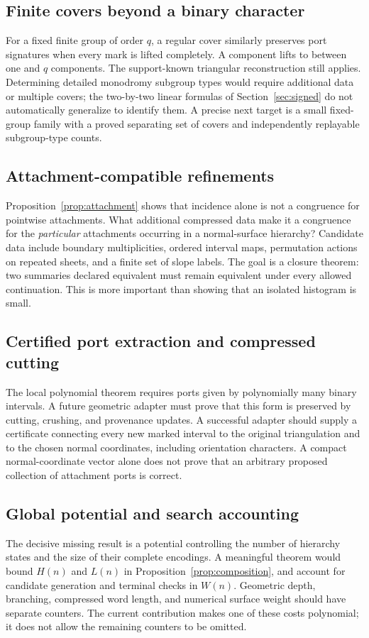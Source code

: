 \documentclass[11pt,letterpaper]{article}
\begin{document}
\subsection{Finite covers beyond a binary character}
For a fixed finite group of order $q$, a regular cover similarly preserves
port signatures when every mark is lifted completely. A component lifts to
between one and $q$ components. The support-known triangular reconstruction
still applies. Determining detailed monodromy subgroup types would require
additional data or multiple covers; the two-by-two linear formulas of
Section~\ref{sec:signed} do not automatically generalize to identify them.
A precise next target is a small fixed-group family with a proved separating
set of covers and independently replayable subgroup-type counts.

\subsection{Attachment-compatible refinements}
Proposition~\ref{prop:attachment} shows that incidence alone is not a congruence
for pointwise attachments. What additional compressed data make it a congruence
for the \emph{particular} attachments occurring in a normal-surface hierarchy?
Candidate data include boundary multiplicities, ordered interval maps,
permutation actions on repeated sheets, and a finite set of slope labels.
The goal is a closure theorem: two summaries declared equivalent must remain
equivalent under every allowed continuation. This is more important than
showing that an isolated histogram is small.

\subsection{Certified port extraction and compressed cutting}
The local polynomial theorem requires ports given by polynomially many
binary intervals. A future geometric adapter must prove that this form is
preserved by cutting, crushing, and provenance updates. A successful adapter
should supply a certificate connecting every new marked interval to the
original triangulation and to the chosen normal coordinates, including
orientation characters. A compact normal-coordinate vector alone does not
prove that an arbitrary proposed collection of attachment ports is correct.

\subsection{Global potential and search accounting}
The decisive missing result is a potential controlling the number of hierarchy
states and the size of their complete encodings. A meaningful theorem would
bound $H(n)$ and $L(n)$ in Proposition~\ref{prop:composition}, and account for
candidate generation and terminal checks in $W(n)$. Geometric depth,
branching, compressed word length, and numerical surface weight should have
separate counters. The current contribution makes one of these costs
polynomial; it does not allow the remaining counters to be omitted.
\end{document}
